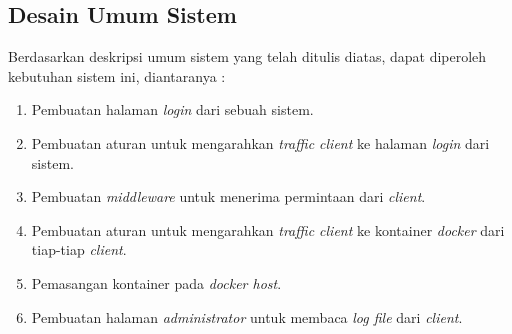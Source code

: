 \subsection{Desain Umum Sistem}
\indent Berdasarkan deskripsi umum sistem yang telah ditulis diatas, dapat diperoleh kebutuhan sistem ini, diantaranya :
\begin{enumerate}
	\item Pembuatan halaman \textit{login} dari sebuah sistem.
	\item Pembuatan aturan untuk mengarahkan \textit{traffic client} ke halaman \textit{login} dari sistem.
	\item Pembuatan \textit{middleware} untuk menerima permintaan dari \textit{client}.
	\item Pembuatan aturan untuk mengarahkan \textit{traffic client} ke kontainer \textit{docker} dari tiap-tiap \textit{client}.
	\item Pemasangan kontainer pada \textit{docker host}.
	\item Pembuatan halaman \textit{administrator} untuk membaca \textit{log file} dari \textit{client}.
\end{enumerate} 

